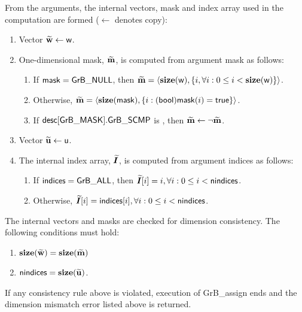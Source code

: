 From the arguments, the internal vectors, mask and index array used in 
the computation are formed ($\leftarrow$ denotes copy):
\begin{enumerate}
	\item Vector ${\bf \widetilde{w}} \leftarrow {\sf w}$.

	\item One-dimensional mask, ${\bf \widetilde{m}}$, is computed from 
    argument {\sf mask} as follows:
	\begin{enumerate}
		\item	If ${\sf mask} = {\sf GrB\_NULL}$, then ${\bf \widetilde{m}} = 
        \langle \bold{size}({\sf w}), \{i, \forall i : 0 \leq i < 
        \bold{size}({\sf w}) \} \rangle$.

		\item	Otherwise, ${\bf \widetilde{m}} = 
        \langle \bold{size}({\sf mask}), \{i : ({\sf bool}){\sf mask}(i) = 
        {\sf true}\} \rangle$.

		\item	If ${\sf desc[GrB\_MASK].GrB\_SCMP}$ is \true, then 
        ${\bf \widetilde{m}} \leftarrow \neg {\bf \widetilde{m}}$.
	\end{enumerate}

	\item Vector ${\bf \widetilde{u}} \leftarrow {\sf u}$.
    
    \item The internal index array, $\bm{\widetilde{I}}$, is computed from 
    argument {\sf indices} as follows:
	\begin{enumerate}
		\item	If ${\sf indices} = {\sf GrB\_ALL}$, then 
        $\bm{\widetilde{I}}[i] = i, \forall i : 0 \leq i < {\sf nindices}$.

		\item	Otherwise, $\bm{\widetilde{I}}[i] = {\sf indices}[i], 
        \forall i : 0 \leq i < {\sf nindices}$.
    \end{enumerate}
\end{enumerate}

The internal vectors and masks are checked for dimension consistency. 
The following conditions must hold:
\begin{enumerate}
	\item $\bold{size}({\bf \widetilde{w}}) = \bold{size}({\bf \widetilde{m}})$
    \item ${\sf nindices} = \bold{size}({\bf \widetilde{u}})$.
\end{enumerate}
If any consistency rule above is violated, execution of {\sf GrB\_assign} ends and 
the dimension mismatch error listed above is returned.


